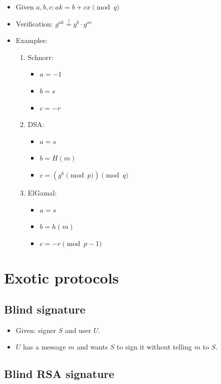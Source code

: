 \documentclass[11pt]{article}
\theoremstyle{definition}
\theoremstyle{proof}
\begin{document}
\begin{itemize}
	\item Given $a, b, c: ak = b + cx \pmod q$
	\item Verification: $g^{ak} \stackrel{?}{=} g^b \cdot g^{xc}$
	\item Examples:
	\begin{enumerate}
		\item Schnorr:
		\begin{itemize}
			\item $a = -1$
			\item $b = s$
			\item $c = -r$
		\end{itemize}
		\item DSA:
		\begin{itemize}
			\item $a = s$
			\item $b = H(m)$
			\item $c = (g^k \pmod{p}) \pmod{q}$
		\end{itemize}
		\item ElGamal:
		\begin{itemize}
			\item $a = s$
			\item $b = h(m)$
			\item $c = -r \pmod{p-1}$
		\end{itemize}
	\end{enumerate}
\end{itemize}

\section{Exotic protocols}

\subsection{Blind signature}

\begin{itemize}
	\item Given: signer $S$ and user $U$.
	\item $U$ has a message $m$ and wants $S$ to sign it without telling $m$ to $S$.
\end{itemize}

\subsection{Blind RSA signature}
\end{document}
